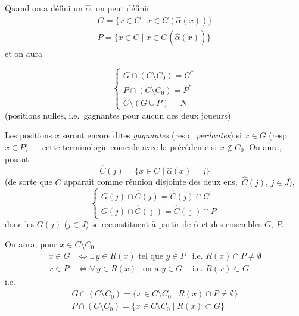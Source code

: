 \documentclass[11pt,a4paper]{article}
\begin{document}
Quand on a défini un $\hat\alpha$, on peut définir
\[
\begin{array}{l}
G = \{ x \in C \mid x \in G(\hat\alpha(x)) \} \\
P = \{ x \in C \mid x \in G(\bar{\hat\alpha}(x)) \}
\end{array}
\]
et on \struck{\ill{}} aura

\[
\begin{cases}
G \cap (C \setminus C_0) = G^{*} \\
P \cap (C \setminus C_0) = P^{*} \\
C \setminus (G \cup P) = N
\end{cases}
\]
(positions nulles, i.e.\ gagnantes pour aucun des deux joueurs)

Les positions $x$ seront encore dites \emph{gagnantes} (resp.\
\emph{perdantes}) si $x \in G$ (resp.\ $x \in P$) — cette terminologie
coïncide avec la précédente si $x \notin C_0$. On aura, posant
\struck{\ill{}}
\[
\hat C(j) = \{ x \in C \mid \hat\alpha(x) = j \}
\]
(de sorte que $C$ apparaît comme réunion disjointe des deux ens.\
$\hat C(j)$, $j \in J$),
\[
\begin{cases}
G(j) \cap \hat C(j) = \hat C(j) \cap G \\
G(j) \cap \hat C(\bar\jmath) = \hat C(\bar\jmath) \cap P
\end{cases}
\]
donc les $G(j)$ ($j \in J$) se reconstituent à partir de $\hat\alpha$ et des
ensembles $G$, $P$.

On aura, pour $x \in C \setminus C_0$
\[
\begin{array}{lll}
x \in G & \Longleftrightarrow \exists\, y \in R(x) \text{ tel que } y \in P & \text{i.e. } R(x) \cap P \neq \emptyset \\
x \in P & \Longleftrightarrow \forall\, y \in R(x), \text{ on a } y \in G & \text{i.e. } R(x) \subset G
\end{array}
\]
i.e.
\[
\begin{array}{l}
G \cap (C \setminus C_0) = \{ x \in C \setminus C_0 \mid R(x) \cap P \neq \emptyset \} \\
P \cap (C \setminus C_0) = \{ x \in C \setminus C_0 \mid R(x) \subset G \}
\end{array}
\]
\end{document}
